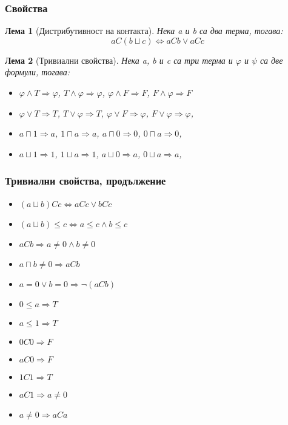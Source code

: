 \documentclass{beamer}
\newtheorem{lema}{Лема}[section]
\begin{document}
\begin{frame}\frametitle{Свойства}
\begin{lema}[Дистрибутивност на контакта]
Нека a и b са два терма, тогава:
	\begin{equation*}
		aC(b \sqcup c) \iff aCb \lor aCc
	\end{equation*}
\end{lema}

\begin{lema}[Тривиални свойства]
Нека a, b и c са три терма и $\varphi$ и $\psi$ са две формули, тогава:
	\begin{itemize}
		\item $\varphi \land T \Longrightarrow \varphi$,\;\; $T \land \varphi \Longrightarrow \varphi$,\;\;
		      $\varphi \land F \Longrightarrow F$,\;\; $F \land \varphi \Longrightarrow F$
		\item $\varphi \lor T \Longrightarrow T$,\;\; $T \lor \varphi \Longrightarrow T$,\;\;
		      $\varphi \lor F \Longrightarrow \varphi$,\;\; $F \lor \varphi \Longrightarrow \varphi$,
		\item $a \sqcap 1 \Longrightarrow a$,\;\; $1 \sqcap a \Longrightarrow a$,\;\;
		      $a \sqcap 0 \Longrightarrow 0$,\;\; $0 \sqcap a \Longrightarrow 0$,
		\item $a \sqcup 1 \Longrightarrow 1$,\;\; $1 \sqcup a \Longrightarrow 1$,\;\;
		      $a \sqcup 0 \Longrightarrow a$,\;\; $0 \sqcup a \Longrightarrow a$,
	\end{itemize}
\end{lema}
\end{frame}
\begin{frame}\frametitle{Тривиални свойства, продължение}
	\begin{itemize}
		\item $(a \sqcup b)Cc \iff aCc \lor bCc$
		\item $(a \sqcup b) \leq c \iff a \leq c \land b \leq c$
		\item $aCb \Longrightarrow a \neq 0 \land b \neq 0$
		\item $a \sqcap b \neq 0 \Longrightarrow aCb$
		\item $a = 0 \lor b = 0 \Longrightarrow \neg(aCb)$
		\item $0 \leq a \Longrightarrow T$
		\item $a \leq 1 \Longrightarrow T$
		\item $0C0 \Longrightarrow F$
		\item $aC0 \Longrightarrow F$
		\item $1C1 \Longrightarrow T$
		\item $aC1 \Longrightarrow a \neq 0$
		\item $a \neq 0 \Longrightarrow aCa$
	\end{itemize}
\end{frame}
\end{document}
